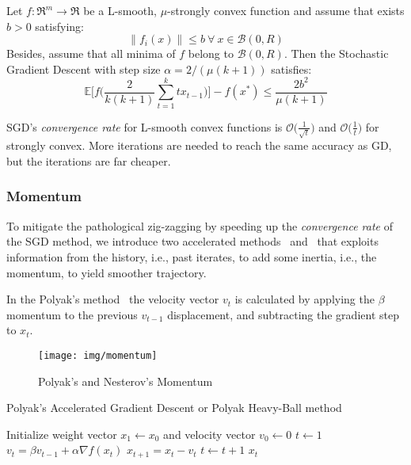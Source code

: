 \begin{theorem} \label{thm:str_cvx_sgd_convergence}
Let $f: \Re^m \rightarrow \Re$ be a L-smooth, $\mu$-strongly convex function and assume that exists $b > 0$ satisfying:
$$
\| f_i(x) \| \leq b \ \forall \ x \in \mathcal{B}(0, R)
$$
Besides, assume that all minima of $f$ belong to $\mathcal{B}(0, R)$. Then the Stochastic Gradient Descent with step size $\alpha = 2/(\mu(k+1))$ satisfies:
$$
\mathbb{E}\Bigg[f\Bigg(\frac{2}{k(k+1)} \sum_{t=1}^k t x_{t-1}\Bigg)\Bigg] - f(x^*) \leq \frac{2b^2}{\mu(k+1)}
$$
\end{theorem}

SGD’s \emph{convergence rate} for L-smooth convex functions is $\displaystyle \mathcal{O}\bigg(\frac{1}{\sqrt{t}}\bigg)$ and $\displaystyle \mathcal{O}\bigg(\frac{1}{t}\bigg)$ for strongly convex. More iterations are needed to reach the same accuracy as GD, but the iterations are far cheaper.

\subsubsection{Momentum}

To mitigate the pathological zig-zagging by speeding up the \emph{convergence rate} of the SGD method, we introduce two accelerated methods~\cite{polyak1964some} and~\cite{nesterov1998introductory, nesterov1983method} that exploits information from the history, i.e., past iterates, to add some inertia, i.e., the momentum, to yield smoother trajectory.

In the Polyak's method~\cite{polyak1964some} the velocity vector $v_t$ is calculated by applying the $\beta$ momentum to the previous $v_{t-1}$ displacement, and subtracting the gradient step to $x_t$.

\begin{figure}[h!]
	\centering
  	\texttt{[image: img/momentum]}
  	\caption{Polyak's and Nesterov's Momentum}
  	\label{fig:momentum}
\end{figure}

\begin{algorithm}[H]
	\caption{Polyak's Accelerated Gradient Descent or Polyak Heavy-Ball method}
	\label{alg:pag}
	\begin{algorithmic}
		\Require{Momentum $\beta \in [0,1)$}
			\State Initialize weight vector $x_1 \gets x_0$ and velocity vector $v_0 \gets 0$
			\State $t \gets 1$
				\State $v_t = \beta v_{t-1} + \alpha \nabla f(x_t)$
				\State $x_{t+1} = x_t - v_t$
				\State $t \gets t + 1$
			\EndWhile
			\State \Return $x_t$
		\EndFunction
	\end{algorithmic}
\end{algorithm}

